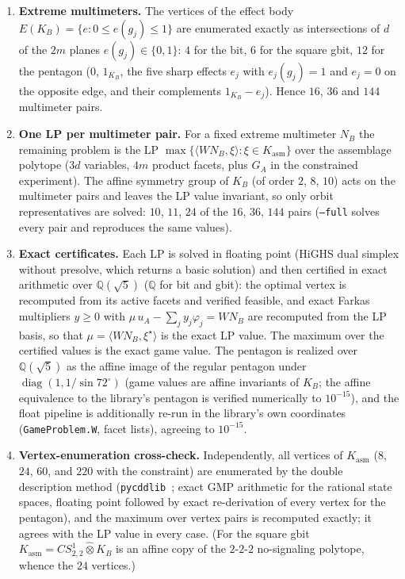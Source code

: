 \documentclass[11pt,a4paper]{article}
\newcommand*{\tmax}{\hat{\otimes}}
\newcommand*{\Kasm}{K_{\mathrm{asm}}}
\newcommand*{\code}[1]{\texttt{#1}}
\theoremstyle{remark}
\begin{document}
\begin{enumerate}[leftmargin=2em]
\item \textbf{Extreme multimeters.} The vertices of the effect body
$E(K_B)=\lbrace e : 0\leq e(g_j)\leq 1\rbrace$ are enumerated exactly as
intersections of $d$ of the $2m$ planes $e(g_j)\in\lbrace 0,1\rbrace$: $4$
for the bit, $6$ for the square gbit, $12$ for the pentagon ($0$, $1_{K_B}$,
the five sharp effects $e_j$ with $e_j(g_j)=1$ and $e_j=0$ on the opposite
edge, and their complements $1_{K_B}-e_j$). Hence $16$, $36$ and $144$
multimeter pairs.
\item \textbf{One LP per multimeter pair.} For a fixed extreme multimeter
$N_B$ the remaining problem is the LP $\max\lbrace\langle W N_B,\xi\rangle :
\xi\in\Kasm\rbrace$ over the assemblage polytope ($3d$ variables,
$4m$ product facets, plus $G_A$ in the constrained experiment). The affine
symmetry group of $K_B$ (of order $2$, $8$, $10$) acts on the multimeter
pairs and leaves the LP value invariant, so only orbit representatives are
solved: $10$, $11$, $24$ of the $16$, $36$, $144$ pairs (\code{--full}
solves every pair and reproduces the same values).
\item \textbf{Exact certificates.} Each LP is solved in floating point
(HiGHS dual simplex without presolve, which returns a basic solution) and
then certified in exact arithmetic over $\mathbb{Q}(\sqrt5)$ ($\mathbb{Q}$
for bit and gbit): the optimal vertex is recomputed from its active facets
and verified feasible, and exact Farkas multipliers $y\geq 0$ with
$\mu\, u_A - \sum_j y_j\varphi_j = W N_B$ are recomputed from the LP basis,
so that $\mu=\langle W N_B,\xi^\star\rangle$ is the exact LP value. The
maximum over the certified values is the exact game value. The pentagon is
realized over $\mathbb{Q}(\sqrt5)$ as the affine image of the regular
pentagon under $\operatorname{diag}(1, 1/\sin 72^\circ)$ (game values are
affine invariants of $K_B$; the affine equivalence to the library's
pentagon is verified numerically to $10^{-15}$), and the float pipeline is
additionally re-run in the library's own coordinates
(\code{GameProblem.W}, facet lists), agreeing to $10^{-15}$.
\item \textbf{Vertex-enumeration cross-check.} Independently, all vertices
of $\Kasm$ ($8$, $24$, $60$, and $220$ with the constraint) are enumerated
by the double description method (\code{pycddlib}~\cite{cddlib}; exact GMP
arithmetic for the rational state spaces, floating point followed by exact
re-derivation of every vertex for the pentagon), and the maximum over
vertex pairs is recomputed exactly; it agrees with the LP value in every
case. (For the square gbit $\Kasm=CS^1_{2,2}\tmax K_B$ is an affine copy of
the $2$-$2$-$2$ no-signaling polytope, whence the $24$ vertices.)
\end{enumerate}
\end{document}
